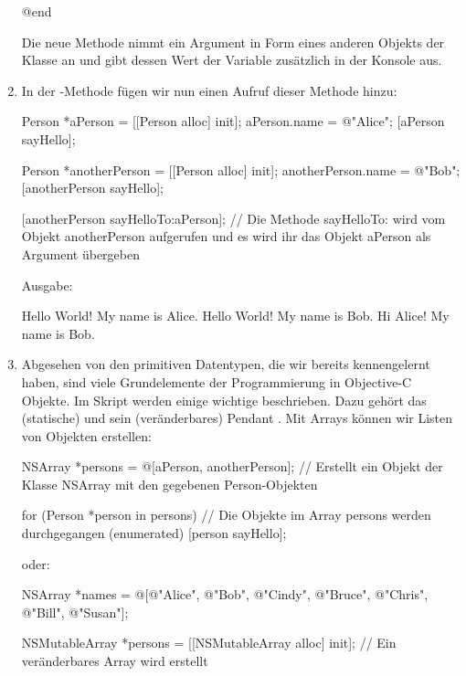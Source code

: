 \documentclass[parskip=half, final]{scrreprt}
\begin{document}
\begin{lecture}
\begin{enumerate}
\begin{objclst}
@end
\end{objclst}

Die neue Methode nimmt ein Argument in Form eines anderen Objekts der Klasse  an und gibt dessen Wert der Variable  zusätzlich in der Konsole aus.

\item In der -Methode fügen wir nun einen Aufruf dieser Methode hinzu:

\begin{objclst}
Person *aPerson = [[Person alloc] init];
aPerson.name = @"Alice";
[aPerson sayHello];

Person *anotherPerson = [[Person alloc] init];
anotherPerson.name = @"Bob";
[anotherPerson sayHello];

[anotherPerson sayHelloTo:aPerson]; // Die Methode sayHelloTo: wird vom Objekt anotherPerson aufgerufen und es wird ihr das Objekt aPerson als Argument übergeben
\end{objclst}

Ausgabe:

\begin{objclst}
Hello World! My name is Alice.
Hello World! My name is Bob.
Hi Alice! My name is Bob.
\end{objclst}

\item Abgesehen von den primitiven Datentypen, die wir bereits kennengelernt haben, sind viele Grundelemente der Programmierung in Objective-C Objekte. Im Skript werden einige wichtige beschrieben. Dazu gehört das (statische)  und sein (veränderbares) Pendant . Mit Arrays können wir Listen von Objekten erstellen:

\begin{objclst}
NSArray *persons = @[aPerson, anotherPerson]; // Erstellt ein Objekt der Klasse NSArray mit den gegebenen Person-Objekten

for (Person *person in persons) { // Die Objekte im Array persons werden durchgegangen (enumerated)
    [person sayHello];
}
\end{objclst}

oder:

\begin{objclst}
NSArray *names = @[@"Alice", @"Bob", @"Cindy", @"Bruce", @"Chris", @"Bill", @"Susan"];

NSMutableArray *persons = [[NSMutableArray alloc] init]; // Ein veränderbares Array wird erstellt


\end{objclst}
\end{enumerate}
\end{lecture}
\end{document}

